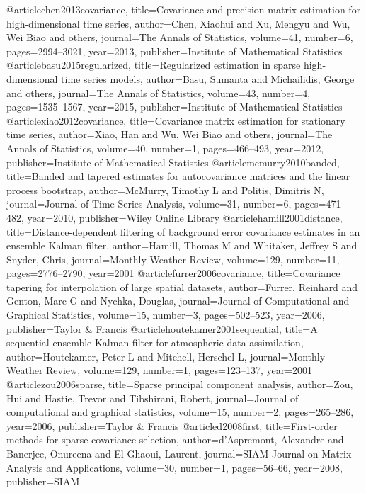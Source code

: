 @article{chen2013covariance,
  title={Covariance and precision matrix estimation for high-dimensional time series},
  author={Chen, Xiaohui and Xu, Mengyu and Wu, Wei Biao and others},
  journal={The Annals of Statistics},
  volume={41},
  number={6},
  pages={2994--3021},
  year={2013},
  publisher={Institute of Mathematical Statistics}
}
@article{basu2015regularized,
  title={Regularized estimation in sparse high-dimensional time series models},
  author={Basu, Sumanta and Michailidis, George and others},
  journal={The Annals of Statistics},
  volume={43},
  number={4},
  pages={1535--1567},
  year={2015},
  publisher={Institute of Mathematical Statistics}
}
@article{xiao2012covariance,
  title={Covariance matrix estimation for stationary time series},
  author={Xiao, Han and Wu, Wei Biao and others},
  journal={The Annals of Statistics},
  volume={40},
  number={1},
  pages={466--493},
  year={2012},
  publisher={Institute of Mathematical Statistics}
}
@article{mcmurry2010banded,
  title={Banded and tapered estimates for autocovariance matrices and the linear process bootstrap},
  author={McMurry, Timothy L and Politis, Dimitris N},
  journal={Journal of Time Series Analysis},
  volume={31},
  number={6},
  pages={471--482},
  year={2010},
  publisher={Wiley Online Library}
}
@article{hamill2001distance,
  title={Distance-dependent filtering of background error covariance estimates in an ensemble Kalman filter},
  author={Hamill, Thomas M and Whitaker, Jeffrey S and Snyder, Chris},
  journal={Monthly Weather Review},
  volume={129},
  number={11},
  pages={2776--2790},
  year={2001}
}
@article{furrer2006covariance,
  title={Covariance tapering for interpolation of large spatial datasets},
  author={Furrer, Reinhard and Genton, Marc G and Nychka, Douglas},
  journal={Journal of Computational and Graphical Statistics},
  volume={15},
  number={3},
  pages={502--523},
  year={2006},
  publisher={Taylor \& Francis}
}
@article{houtekamer2001sequential,
  title={A sequential ensemble Kalman filter for atmospheric data assimilation},
  author={Houtekamer, Peter L and Mitchell, Herschel L},
  journal={Monthly Weather Review},
  volume={129},
  number={1},
  pages={123--137},
  year={2001}
}
@article{zou2006sparse,
  title={Sparse principal component analysis},
  author={Zou, Hui and Hastie, Trevor and Tibshirani, Robert},
  journal={Journal of computational and graphical statistics},
  volume={15},
  number={2},
  pages={265--286},
  year={2006},
  publisher={Taylor \& Francis}
}
@article{d2008first,
  title={First-order methods for sparse covariance selection},
  author={d'Aspremont, Alexandre and Banerjee, Onureena and El Ghaoui, Laurent},
  journal={SIAM Journal on Matrix Analysis and Applications},
  volume={30},
  number={1},
  pages={56--66},
  year={2008},
  publisher={SIAM}
}
